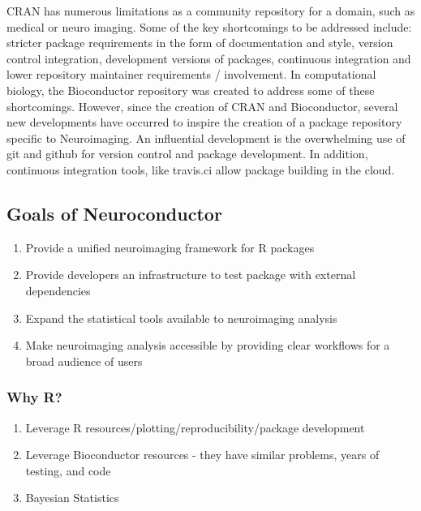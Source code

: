 \documentclass[]{elsarticle} %
\providecommand{\tightlist}{%
  \setlength{\itemsep}{0pt}\setlength{\parskip}{0pt}}
\begin{document}
CRAN has numerous limitations as a community repository for a domain,
such as medical or neuro imaging. Some of the key shortcomings to be
addressed include: stricter package requirements in the form of
documentation and style, version control integration, development
versions of packages, continuous integration and lower repository
maintainer requirements / involvement. In computational biology, the
Bioconductor repository was created to address some of these
shortcomings. However, since the creation of CRAN and Bioconductor,
several new developments have occurred to inspire the creation of a
package repository specific to Neuroimaging. An influential development
is the overwhelming use of git and github for version control and
package development. In addition, continuous integration tools, like
travis.ci allow package building in the cloud.

\subsection{Goals of Neuroconductor}\label{goals-of-neuroconductor}

\begin{enumerate}
\def\labelenumi{\arabic{enumi}.}
\tightlist
\item
  Provide a unified neuroimaging framework for R packages
\item
  Provide developers an infrastructure to test package with external
  dependencies
\item
  Expand the statistical tools available to neuroimaging analysis
\item
  Make neuroimaging analysis accessible by providing clear workflows for
  a broad audience of users
\end{enumerate}

\subsubsection{Why R?}\label{why-r}

\begin{enumerate}
\def\labelenumi{\arabic{enumi}.}
\setcounter{enumi}{2}
\tightlist
\item
  Leverage R resources/plotting/reproducibility/package development
\item
  Leverage Bioconductor resources - they have similar problems, years of
  testing, and code
\item
  Bayesian Statistics
\end{enumerate}
\end{document}
